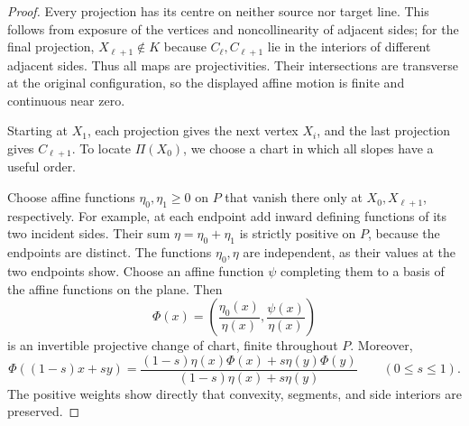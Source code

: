 \documentclass[11pt,a4paper]{article}
\theoremstyle{definition}
\theoremstyle{remark}
\numberwithin{equation}{section}
\begin{document}
\begin{proof}
Every projection has its centre on neither source nor target line.  This
follows from exposure of the vertices and noncollinearity of adjacent sides;
for the final projection, $X_{\ell+1}\notin K$ because $C_\ell,C_{\ell+1}$ lie
in the interiors of different adjacent sides.  Thus all maps are
projectivities.  Their intersections are transverse at the original
configuration, so the displayed affine motion is finite and continuous
near zero.

Starting at $X_1$, each projection gives the next vertex $X_i$, and
the last projection gives $C_{\ell+1}$.  To locate $\Pi(X_0)$, we choose
a chart in which all slopes have a useful order.

Choose affine functions $\eta_0,\eta_1\ge0$ on $P$ that vanish there
only at $X_0,X_{\ell+1}$, respectively.  For example, at each endpoint
add inward defining functions of its two incident sides.  Their sum
$\eta=\eta_0+\eta_1$ is strictly positive on $P$, because the endpoints
are distinct.  The functions $\eta_0,\eta$ are independent, as their
values at the two endpoints show.  Choose an affine function $\psi$
completing them to a basis of the affine functions on the plane.  Then
\[
 \Phi(x)=\left(\frac{\eta_0(x)}{\eta(x)},
                  \frac{\psi(x)}{\eta(x)}\right)
\]
is an invertible projective change of chart, finite throughout $P$.
Moreover,
\[
 \Phi((1-s)x+sy)=
 \frac{(1-s)\eta(x)\Phi(x)+s\eta(y)\Phi(y)}
 {(1-s)\eta(x)+s\eta(y)}\qquad(0\le s\le1).
\]
The positive weights show directly that convexity, segments, and side
interiors are preserved.


\end{proof}
\end{document}
